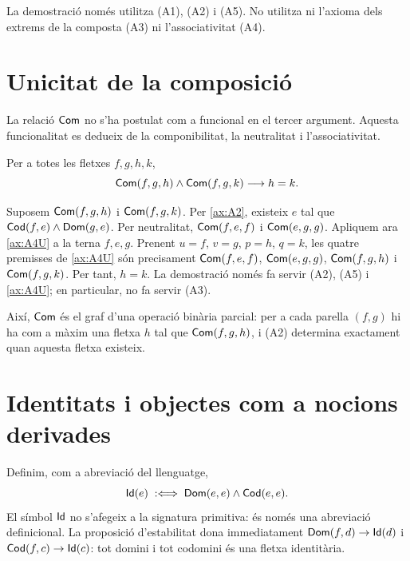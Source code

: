 \begin{observacio}
La demostració només utilitza (A1), (A2) i (A5). No utilitza ni l'axioma dels extrems de la composta (A3) ni l'associativitat (A4).
\end{observacio}

\section{Unicitat de la composició}
\label{sec:ar-unicitat}

La relació $\mathsf{Com}$ no s'ha postulat com a funcional en el tercer argument. Aquesta funcionalitat es dedueix de la componibilitat, la neutralitat i l'associativitat.

\begin{proposicio}
\label{prop:ar-unicitat}
Per a totes les fletxes $f,g,h,k$,
\[
\mathsf{Com}(f,g,h)\land\mathsf{Com}(f,g,k)\longrightarrow h=k.
\]
\end{proposicio}

\begin{prova}
Suposem $\mathsf{Com}(f,g,h)$ i $\mathsf{Com}(f,g,k)$. Per \eqref{ax:A2}, existeix $e$ tal que $\mathsf{Cod}(f,e)\land\mathsf{Dom}(g,e)$. Per neutralitat, $\mathsf{Com}(f,e,f)$ i $\mathsf{Com}(e,g,g)$. Apliquem ara \eqref{ax:A4U} a la terna $f,e,g$. Prenent $u=f$, $v=g$, $p=h$, $q=k$, les quatre premisses de \eqref{ax:A4U} són precisament $\mathsf{Com}(f,e,f)$, $\mathsf{Com}(e,g,g)$, $\mathsf{Com}(f,g,h)$ i $\mathsf{Com}(f,g,k)$. Per tant, $h=k$. La demostració només fa servir (A2), (A5) i \eqref{ax:A4U}; en particular, no fa servir (A3).
\end{prova}

Així, $\mathsf{Com}$ és el graf d'una operació binària parcial: per a cada parella $(f,g)$ hi ha com a màxim una fletxa $h$ tal que $\mathsf{Com}(f,g,h)$, i (A2) determina exactament quan aquesta fletxa existeix.

\section{Identitats i objectes com a nocions derivades}
\label{sec:ar-identitats}

Definim, com a abreviació del llenguatge,
\begin{equation}
\mathsf{Id}(e)
\;:\Longleftrightarrow\;
\mathsf{Dom}(e,e)\land\mathsf{Cod}(e,e).
\label{def:ar-Id}
\end{equation}
El símbol $\mathsf{Id}$ no s'afegeix a la signatura primitiva: és només una abreviació definicional. La proposició d'estabilitat dona immediatament $\mathsf{Dom}(f,d)\rightarrow\mathsf{Id}(d)$ i $\mathsf{Cod}(f,c)\rightarrow\mathsf{Id}(c)$: tot domini i tot codomini és una fletxa identitària.

